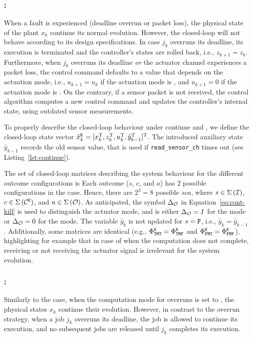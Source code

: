 \subsubsection*{\tK{}:}
%
When a fault is experienced (deadline overrun or packet loss), the physical state of the plant $x_k$ continue its normal evolution.
However, the closed-loop will not behave according to its design specifications.
In case $j_k$ overruns its deadline, its execution is terminated and the controller's states are rolled back, i.e., $z_{k+1} = z_k$.
Furthermore, when $j_k$ overruns its deadline \emph{or} the actuator channel experiences a packet loss, the control command defaults to a value that depends on the actuation mode, i.e., $u_{k+1} = u_k$ if the actuation mode is \tH{}, and $u_{k+1} = 0$ if the actuation mode is \tZ{}.
On the contrary, if a sensor packet is not received, the control algorithm computes a new control command and updates the controller's internal state, using outdated sensor measurements.

To properly describe the closed-loop behaviour under continue and \tK{}, we define the closed-loop state vector 
%
$\tilde x_k^{\texttt{K}} = [ x_k^{\mathrm{\small{T}}}{}, z_k^{\mathrm{\small{T}}}{}, u_k^{\mathrm{\small{T}}}{}, \hat y_{k-1}^{\mathrm{\small{T}}}{} ]^{\mathrm{\small{T}}}{}.$
%
The introduced auxiliary state $\hat y_{k-1}$ records the old sensor value, that is used if \texttt{read\_sensor\_ch} times out (see Listing~\ref{lst:continue}).

The set of closed-loop matrices describing the system behaviour for the different outcome configurations is 
%
Each outcome ($s$, $c$, and $a$) has $2$ possible configurations in the \tK{} case.
Hence, there are $2^3 = 8$ possible $sca$, where $s \in \Sigma\left( \mathcal{I} \right)$, $c \in \Sigma\,({\mathcal{C}^{\texttt{K}}})$, and $a \in \Sigma\left( \mathcal{O} \right)$.
As anticipated, the symbol $\Delta_{\mathcal{O}}$ in Equation~\eqref{eq:cont-kill} is used to distinguish the actuator mode, and is either $\Delta_{\mathcal{O}} = I$ for the \tH{} mode or $\Delta_{\mathcal{O}} = 0$ for the \tZ{} mode.
The variable $\hat y_k$ is not updated for $s = \texttt{F}$, i.e., $\hat y_k = \hat y_{k-1}$.
Additionally, some matrices are identical (e.g., $\Phi^{\texttt{K}}_{\texttt{T}\texttt{M}\texttt{T}}=\Phi^{\texttt{K}}_{\texttt{T}\texttt{M}\texttt{F}}$ and $\Phi^{\texttt{K}}_{\texttt{F}\texttt{M}\texttt{T}}=\Phi^{\texttt{K}}_{\texttt{F}\texttt{M}\texttt{F}}$), highlighting for example that in case of \tK{} when the computation does not complete, receiving or not receiving the actuator signal is irrelevant for the system evolution.

\subsubsection*{\tS{}:}
Similarly to the \tK{} case, when the computation mode for overruns is set to \tS{}, the physical states $x_k$ continue their evolution.
However, in contrast to the \tK{} overrun strategy, when a job $j_k$ overruns its deadline, the job is allowed to continue its execution, and no subsequent jobs are released until $j_k$ completes its execution.

